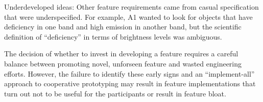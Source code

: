 {\begin{denselist}
 \item Underdeveloped ideas: Other feature requirements came from casual specification that were underspecified. For example, A1 wanted to look for objects that have deficiency in one band and high emission in another band, but the scientific definition of ``deficiency'' in terms of brightness levels was ambiguous.
 \end{denselist}
 \npar The decision of whether to invest in developing a feature requires a careful balance between promoting novel, unforseen feature and wasted engineering efforts. However, the failure to identify these early signs and an ``implement-all'' approach to cooperative prototyping may result in feature implementations that turn out not to be useful for the participants or result in feature bloat.
 } 
 